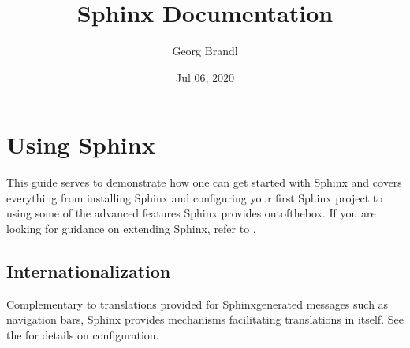 \documentclass[letterpaper,10pt,english]{sphinxmanual}
\title{Sphinx Documentation}
\date{Jul 06, 2020}
\author{Georg Brandl}
\begin{document}
\pagestyle{empty}
\sphinxmaketitle
\pagestyle{plain}
\sphinxtableofcontents
\pagestyle{normal}
\label{\detokenize{contents::doc}}



\chapter{Using Sphinx}
\label{\detokenize{usage/index:using-sphinx}}\label{\detokenize{usage/index::doc}}
This guide serves to demonstrate how one can get started with Sphinx and covers
everything from installing Sphinx and configuring your first Sphinx project to
using some of the advanced features Sphinx provides out\sphinxhyphen{}of\sphinxhyphen{}the\sphinxhyphen{}box. If you are
looking for guidance on extending Sphinx, refer to .


\section{Internationalization}
\label{\detokenize{usage/advanced/intl:internationalization}}\label{\detokenize{usage/advanced/intl:intl}}\label{\detokenize{usage/advanced/intl::doc}}

Complementary to translations provided for Sphinx\sphinxhyphen{}generated messages such as
navigation bars, Sphinx provides mechanisms facilitating  translations
in itself.  See the  for details on configuration.
\end{document}
